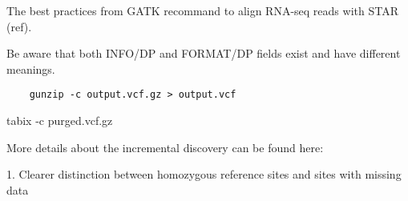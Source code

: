 The best practices from GATK recommand to align RNA-seq reads with STAR (ref). 

Be aware that both INFO/DP and FORMAT/DP fields exist and have different meanings.

\begin{verbatim}
	gunzip -c output.vcf.gz > output.vcf
\end{verbatim}




tabix -c purged.vcf.gz


More details about the incremental discovery can be found here:

1. Clearer distinction between homozygous reference sites and sites with missing data

